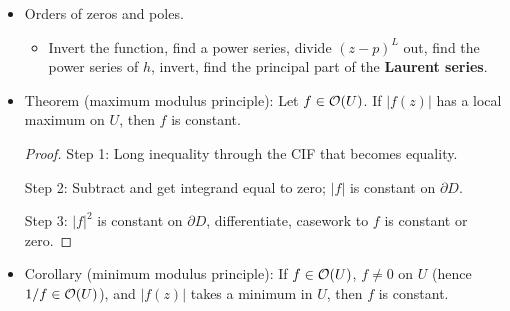\documentclass[../notes.tex]{subfiles}
\begin{document}
\begin{itemize}
    \item Orders of zeros and poles.
    \begin{itemize}
        \item Invert the function, find a power series, divide $(z-p)^L$ out, find the power series of $h$, invert, find the principal part of the \textbf{Laurent series}.
    \end{itemize}
    \item Theorem (maximum modulus principle): Let $f\in\mathcal{O}(U)$. If $|f(z)|$ has a local maximum on $U$, then $f$ is constant.
    \begin{proof}
        Step 1: Long inequality through the CIF that becomes equality.\par
        Step 2: Subtract and get integrand equal to zero; $|f|$ is constant on $\partial D$.\par
        Step 3: $|f|^2$ is constant on $\partial D$, differentiate, casework to $f$ is constant or zero.
    \end{proof}
    \item Corollary (minimum modulus principle): If $f\in\mathcal{O}(U)$, $f\neq 0$ on $U$ (hence $1/f\in\mathcal{O}(U)$), and $|f(z)|$ takes a minimum in $U$, then $f$ is constant.
\end{itemize}
\end{document}
